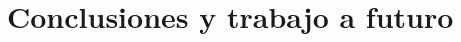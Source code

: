 \chapter{Conclusiones y trabajo a futuro} \label{conclusiones}















% 
% 
% 
% 
% 
% 
% 
% 
% 
% 
